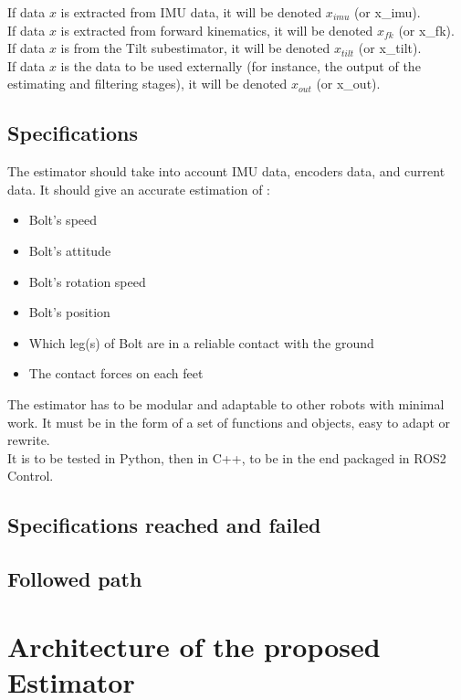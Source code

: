 \documentclass[a4paper,10pt]{article}
\begin{document}
If data $x$ is extracted from IMU data, it will be denoted $x_{imu}$ (or x\_imu).\\
If data $x$ is extracted from forward kinematics, it will be denoted $x_{fk}$ (or x\_fk).\\
If data $x$ is from the Tilt subestimator, it will be denoted $x_{tilt}$ (or x\_tilt).\\
If data $x$ is the data to be used externally (for instance, the output of the estimating and filtering stages), it will be denoted $x_{out}$ (or x\_out).\\

\subsection{Specifications}
The estimator should take into account IMU data, encoders data, and current data. It should give an accurate estimation of :
\begin{itemize}
	\item{Bolt's speed}
	\item{Bolt's attitude}
	\item{Bolt's rotation speed}
	\item{Bolt's position}
	\item{Which leg(s) of Bolt are in a reliable contact with the ground}
	\item{The contact forces on each feet}
\end{itemize}
The estimator has to be modular and adaptable to other robots with minimal work. It must be in the form of a set of functions and objects, easy to adapt or rewrite.\\  
It is to be tested in Python, then in C++, to be in the end packaged in ROS2 Control. 

\subsection{Specifications reached and failed}



\subsection{Followed path}



\section{Architecture of the proposed Estimator}
\end{document}

